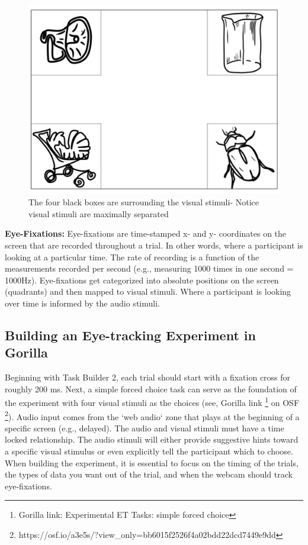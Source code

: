 \begin{figure}[h]
    \centering
    \includegraphics[scale=.35]{figures/Visual_stimuli.png}
    \caption{The four black boxes are surrounding the visual stimuli- Notice visual stimuli are maximally separated}
    \label{fig:Visual_stimuli.png}
\end{figure}

\textbf{Eye-Fixations:} Eye-fixations are time-stamped x- and y- coordinates on the screen that are recorded throughout a trial. In other words, where a participant is looking at a particular time. The rate of recording is a function of the measurements recorded per second (e.g., measuring 1000 times in one second = 1000Hz). Eye-fixations get categorized into absolute positions on the screen (quadrants) and then mapped to visual stimuli. Where a participant is looking over time is informed by the audio stimuli.

\subsection{Building an Eye-tracking Experiment in Gorilla}

Beginning with Task Builder 2, each trial should start with a fixation cross for roughly 200 ms. Next, a simple forced choice task can serve as the foundation of the experiment with four visual stimuli as the choices (see, Gorilla link \footnote{Gorilla link: Experimental ET Tasks: simple forced choice} on OSF \footnote{https://osf.io/a3e5s/?view\_only=bb6015f2526f4a02bdd22dcd7449e9dd}). Audio input comes from the `web audio` zone that plays at the beginning of a specific screen (e.g., delayed). The audio and visual stimuli must have a time locked relationship. The audio stimuli will either provide suggestive hints toward a specific visual stimulus or even explicitly tell the participant which to choose. When building the experiment, it is essential to focus on the timing of the trials, the types of data you want out of the trial, and when the webcam should track eye-fixations. 

